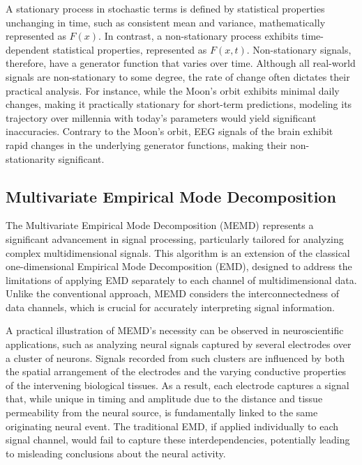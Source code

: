 A stationary process in stochastic terms is defined by statistical properties unchanging in time, such as consistent mean and variance, mathematically represented as \(F(x)\). In contrast, a non-stationary process exhibits time-dependent statistical properties, represented as \(F(x,t)\). Non-stationary signals, therefore, have a generator function that varies over time. Although all real-world signals are non-stationary to some degree, the rate of change often dictates their practical analysis\cite{Brockwell1991}. For instance, while the Moon's orbit exhibits minimal daily changes, making it practically stationary for short-term predictions, modeling its trajectory over millennia with today's parameters would yield significant inaccuracies. Contrary to the Moon's orbit, EEG signals of the brain exhibit rapid changes in the underlying generator functions, making their non-stationarity significant\cite{Klonowski2009}. 
 

\subsection{Multivariate Empirical Mode Decomposition}

The Multivariate Empirical Mode Decomposition (MEMD) represents a significant advancement in signal processing, particularly tailored for analyzing complex multidimensional signals\cite{Mandic2013}. This algorithm is an extension of the classical one-dimensional Empirical Mode Decomposition (EMD)\cite{Huang1998EMD}, designed to address the limitations of applying EMD separately to each channel of multidimensional data. Unlike the conventional approach, MEMD considers the interconnectedness of data channels, which is crucial for accurately interpreting signal information.

A practical illustration of MEMD's necessity can be observed in neuroscientific applications, such as analyzing neural signals captured by several electrodes over a cluster of neurons. Signals recorded from such clusters are influenced by both the spatial arrangement of the electrodes and the varying conductive properties of the intervening biological tissues. As a result, each electrode captures a signal that, while unique in timing and amplitude due to the distance and tissue permeability from the neural source, is fundamentally linked to the same originating neural event. The traditional EMD, if applied individually to each signal channel, would fail to capture these interdependencies, potentially leading to misleading conclusions about the neural activity.

